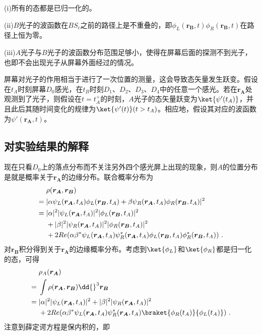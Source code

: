 (i)所有的态都是已归一化的。

(ii)$B$光子的波函数在$BS_c$之前的路径上是不重叠的，即$\phi_L(\boldsymbol{r_B},t)\phi_R(\boldsymbol{r_B},t)$在路径上恒为零。

(iii)$A$光子与$B$光子的波函数分布范围足够小，使得在屏幕后面的探测不到光子，也即不会出现光子从屏幕外面经过的情况。


屏幕对光子的作用相当于进行了一次位置的测量，这会导致态矢量发生跃变。假设在$t_A$时刻屏幕$D_0$感光，在$t_B$时刻$D_1$、$D_2$、$D_3$、$D_4$中的任意一个感光。若在$\boldsymbol{r_A}$处观测到了光子，则假设在$t=t_A^+$的时刻，$A$光子的态矢量跃变为$\ket{\psi'(t_A)}$，并且此后其随时间变化的规律为$\ket{\psi'(t)}(t>t_A)$。相应地，假设其对应的波函数为$\psi'(\boldsymbol{r_A},t)$。

\subsection{对实验结果的解释}
现在只看$D_0$上的落点分布而不关注另外四个感光屏上出现的现象，则$A$的位置分布是就是概率关于$\boldsymbol{r_A}$的边缘分布。联合概率分布为
\begin{align}\label{eq_DCQE_8}
&\rho(\boldsymbol{r_A},\boldsymbol{r_B}) \notag \\
={}&|\alpha\psi_L(\boldsymbol{r_A},t_A)\phi_L(\boldsymbol{r_B},t_A)+\beta\psi_R(\boldsymbol{r_A},t_A)\phi_R(\boldsymbol{r_B},t_A)|^2 \notag \\
={}&|\alpha|^2|\psi_L(\boldsymbol{r_A},t_A)|^2|\phi_L(\boldsymbol{r_B},t_A)|^2 \notag \\
&+|\beta|^2|\psi_R(\boldsymbol{r_A},t_A)|^2|\phi_R(\boldsymbol{r_B},t_A)|^2 \notag \\
&+2Re(\alpha\beta^*\psi_L(\boldsymbol{r_A},t_A)\psi_R^*(\boldsymbol{r_A},t_A)\phi_L(\boldsymbol{r_B},t_A)\phi_R^*(\boldsymbol{r_B},t_A))~.
\end{align}
对$\boldsymbol{r_B}$积分得到关于$\boldsymbol{r_A}$的边缘概率分布。考虑到$\ket{\phi_L}$和$\ket{\phi_R}$都是归一化的态，可得
\begin{align}
&\rho_A(\boldsymbol{r_A}) \notag \\
={}&\int \rho(\boldsymbol{r_A},\boldsymbol{r_B})\dd{}^3\boldsymbol{r_B} \notag \\
={}&|\alpha|^2|\psi_L(\boldsymbol{r_A},t_A)|^2+|\beta|^2|\psi_R(\boldsymbol{r_A},t_A)|^2 \notag \\
&+2Re(\alpha\beta^*\psi_L(\boldsymbol{r_A},t_A)\psi_R^*(\boldsymbol{r_A},t_A)\braket{\phi_R(t_A)}{\phi_L(t_A)})~.
\end{align}
注意到薛定谔方程是保内积的，即
